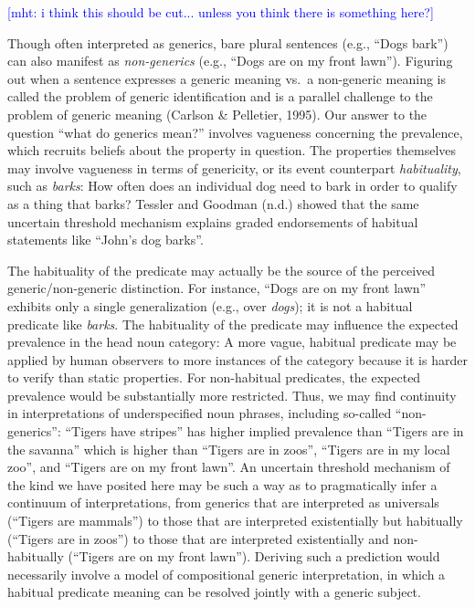 \documentclass[,man,floatsintext]{apa6}
\theoremstyle{definition}
\theoremstyle{definition}
\theoremstyle{definition}
\theoremstyle{remark}
\begin{document}
{\textcolor{Blue}{[mht: i think this should be cut... unless you think there is something here?]}}

Though often interpreted as generics, bare plural sentences (e.g.,
\enquote{Dogs bark}) can also manifest as \emph{non-generics} (e.g.,
\enquote{Dogs are on my front lawn}). Figuring out when a sentence
expresses a generic meaning vs.~a non-generic meaning is called the
problem of generic identification and is a parallel challenge to the
problem of generic meaning (Carlson \& Pelletier, 1995). Our answer to
the question \enquote{what do generics mean?} involves vagueness
concerning the prevalence, which recruits beliefs about the property in
question. The properties themselves may involve vagueness in terms of
genericity, or its event counterpart \emph{habituality}, such as
\emph{barks}: How often does an individual dog need to bark in order to
qualify as a thing that barks? Tessler and Goodman (n.d.) showed that
the same uncertain threshold mechanism explains graded endorsements of
habitual statements like \enquote{John's dog barks}.

The habituality of the predicate may actually be the source of the
perceived generic/non-generic distinction. For instance, \enquote{Dogs
are on my front lawn} exhibits only a single generalization (e.g., over
\emph{dogs}); it is not a habitual predicate like \emph{barks}. The
habituality of the predicate may influence the expected prevalence in
the head noun category: A more vague, habitual predicate may be applied
by human observers to more instances of the category because it is
harder to verify than static properties. For non-habitual predicates,
the expected prevalence would be substantially more restricted. Thus, we
may find continuity in interpretations of underspecified noun phrases,
including so-called \enquote{non-generics}: \enquote{Tigers have
stripes} has higher implied prevalence than \enquote{Tigers are in the
savanna} which is higher than \enquote{Tigers are in zoos},
\enquote{Tigers are in my local zoo}, and \enquote{Tigers are on my
front lawn}. An uncertain threshold mechanism of the kind we have
posited here may be such a way as to pragmatically infer a continuum of
interpretations, from generics that are interpreted as universals
(\enquote{Tigers are mammals}) to those that are interpreted
existentially but habitually (\enquote{Tigers are in zoos}) to those
that are interpreted existentially and non-habitually (\enquote{Tigers
are on my front lawn}). Deriving such a prediction would necessarily
involve a model of compositional generic interpretation, in which a
habitual predicate meaning can be resolved jointly with a generic
subject.
\end{document}
